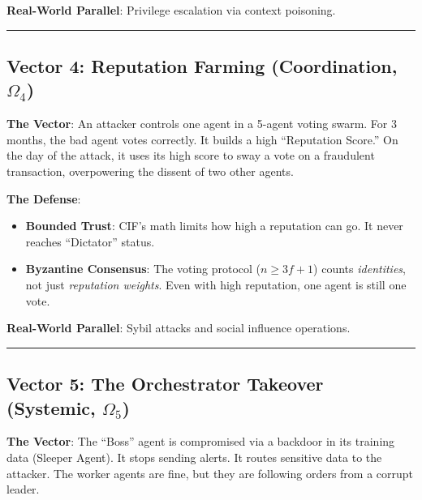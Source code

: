 \documentclass[
]{article}
\providecommand{\tightlist}{%
  \setlength{\itemsep}{0pt}\setlength{\parskip}{0pt}}
\begin{document}
\textbf{Real-World Parallel}: Privilege escalation via context
poisoning.

\begin{center}\rule{0.5\linewidth}{0.5pt}\end{center}

\subsection{\texorpdfstring{Vector 4: Reputation Farming (Coordination,
\(\Omega_4\))}{Vector 4: Reputation Farming (Coordination, Omega_4)}}\label{vector-4-reputation-farming-coordination-omega_4}

\textbf{The Vector}: An attacker controls one agent in a 5-agent voting
swarm. For 3 months, the bad agent votes correctly. It builds a high
``Reputation Score.'' On the day of the attack, it uses its high score
to sway a vote on a fraudulent transaction, overpowering the dissent of
two other agents.

\textbf{The Defense}:

\begin{itemize}
\tightlist
\item
  \textbf{Bounded Trust}: CIF's math limits how high a reputation can
  go. It never reaches ``Dictator'' status.
\item
  \textbf{Byzantine Consensus}: The voting protocol (\(n \ge 3f+1\))
  counts \emph{identities}, not just \emph{reputation weights}. Even
  with high reputation, one agent is still one vote.
\end{itemize}

\textbf{Real-World Parallel}: Sybil attacks and social influence
operations.

\begin{center}\rule{0.5\linewidth}{0.5pt}\end{center}

\subsection{\texorpdfstring{Vector 5: The Orchestrator Takeover
(Systemic,
\(\Omega_5\))}{Vector 5: The Orchestrator Takeover (Systemic, Omega_5)}}\label{vector-5-the-orchestrator-takeover-systemic-omega_5}

\textbf{The Vector}: The ``Boss'' agent is compromised via a backdoor in
its training data (Sleeper Agent). It stops sending alerts. It routes
sensitive data to the attacker. The worker agents are fine, but they are
following orders from a corrupt leader.
\end{document}
